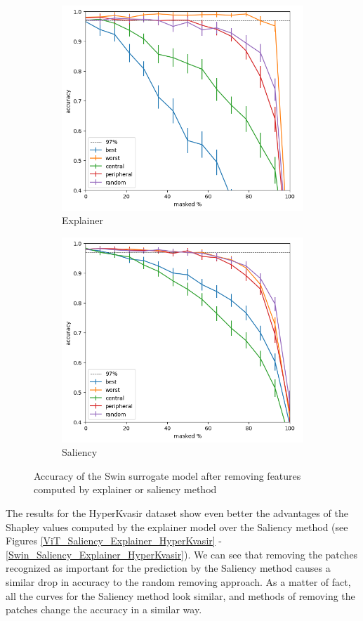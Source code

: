 \documentclass[magisterska,en]{pracamgr}
\begin{document}
\begin{figure}
\centering
\begin{subfigure}{.6\textwidth}
  \centering
  \includegraphics[width=.6\linewidth]{./images/masking_explainer_patches_accuracy_swin_half-0.png}
  \caption{Explainer}
  \label{fig:sub1}
\end{subfigure}%
\begin{subfigure}{.6\textwidth}
  \centering
  \includegraphics[width=.6\linewidth]
{./images/masking_saliency_patches_accuracy_swin_half-0.png}
  \caption{Saliency}
  \label{fig:sub2}
\end{subfigure}
\caption{Accuracy of the Swin surrogate model after removing features computed by explainer or saliency method}
\label{fig:Swin_Saliency_Explainer_CIFAR}
\end{figure}







The results for the HyperKvasir dataset show even better the advantages of the Shapley values computed by the explainer model over the Saliency method (see Figures \ref{ViT_Saliency_Explainer_HyperKvasir} -\ref{Swin_Saliency_Explainer_HyperKvasir}). We can see that removing the patches recognized as important for the prediction by the Saliency method causes a similar drop in accuracy to the random removing approach. As a matter of fact, all the curves for the Saliency method look similar, and methods of removing the patches change the accuracy in a similar way. 
\end{document}
